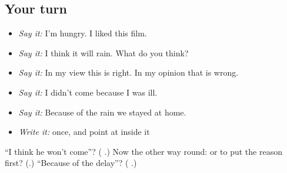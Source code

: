 \subsection*{Your turn}
\begin{itemize}
\raggedright
  \item \emph{Say it:} I'm hungry. I liked this film.
  \item \emph{Say it:} I think it will rain. What do you think?
  \item \emph{Say it:} In my view this is right. In my opinion that is wrong.
  \item \emph{Say it:} I didn't come because I was ill.
  \item \emph{Say it:} Because of the rain we stayed at home.
  \item \emph{Write it:} \textbf{} once, and point at  inside it
\end{itemize}

\begin{tcolorbox}[breakable,colback=teal!4,colframe=teal!35!black,title={Before you move on}]
\textquotedblleft{}I think he won't come\textquotedblright{}? (\textbf{       }.) Now the other way round: \textbf{} or \textbf{} to put the reason first? (\textbf{}.) \textquotedblleft{}Because of the delay\textquotedblright{}? (\textbf{   }.)
\end{tcolorbox}
